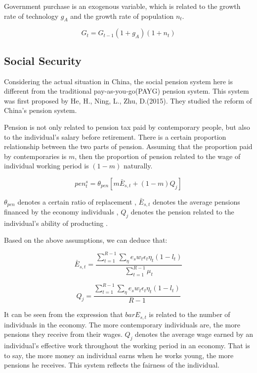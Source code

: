 \documentclass{article}
\begin{document}
        Government purchase is an exogenous variable, which is related to the growth rate of technology $g_A$ and 
        the growth rate of population $n_t$.

        \begin{equation}
            G_t=G_{t-1}(1+g_A)(1+n_t)    
        \end{equation}
    
    \subsection{Social Security}
        Considering the actual situation in China, the social pension system here is different from the 
        traditional pay-as-you-go(PAYG) pension system. This system was first proposed by He, H., Ning, L., Zhu, D.(2015). 
        They studied the reform of China's pension system.

        Pension is not only related to pension tax paid by contemporary people, but also to the individual's salary before retirement. There is a certain proportion relationship between the two parts of pension.
        Assuming that the proportion paid by contemporaries is $m$, then the proportion of pension related to the wage of individual working period is $(1-m)$ naturally.
        
        \begin{equation}
            pen_t^s=\theta_{pen}[m\bar{E}_{s,t}+(1-m)Q_j]
        \end{equation}
        
        $\theta_{pen}$ denotes a certain ratio of replacement , $\bar{E}_{s,t}$ denotes the average pensions financed by the economy individuals ,
        $Q_j$ denotes the pension related to the individual's ability of producting . 

        Based on the above assumptions, we can deduce that:
        
        \begin{equation}
            \bar{E}_{s,t}=\frac{\sum_{t=1}^{R-1}\sum_{\eta}e_sw_t\epsilon_t\eta_t(1-l_t)}{\sum_{t=1}^{R-1}\mu_t}
        \end{equation}

        \begin{equation}
            Q_j=\frac{\sum_{t=1}^{R-1}\sum_{\eta}e_sw_t\epsilon_t\eta_t(1-l_t)}{R-1}
        \end{equation}

        It can be seen from the expression that $bar{E}_{s,t}$  is related to the number of individuals in the economy. The more contemporary individuals are, the more pensions they receive from their wages.
        $Q_j$ denotes the average wage earned by an individual's effective work throughout the working period in an economy. That is to say, the more money an individual earns when he works young, the more pensions he receives. This system reflects the fairness of the individual.
        
\end{document}
